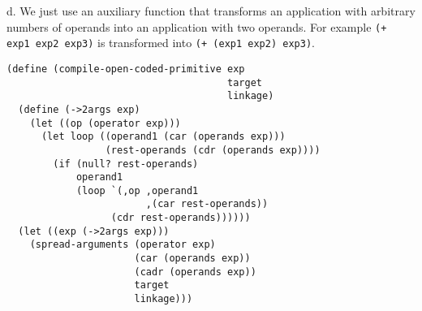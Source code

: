 \documentclass[a4paper,12pt]{article}
\newcommand{\subpar}[1]{\medskip \noindent #1.}
\begin{document}
\subpar{d} We just use an auxiliary function that transforms an
application with arbitrary numbers of operands into an application
with two operands.  For example \lstinline!(+ exp1 exp2 exp3)!  is
transformed into \lstinline!(+ (exp1 exp2) exp3)!.

\begin{lstlisting}
(define (compile-open-coded-primitive exp
                                      target
                                      linkage)
  (define (->2args exp)
    (let ((op (operator exp)))
      (let loop ((operand1 (car (operands exp)))
                 (rest-operands (cdr (operands exp))))
        (if (null? rest-operands)
            operand1
            (loop `(,op ,operand1
                        ,(car rest-operands))
                  (cdr rest-operands))))))
  (let ((exp (->2args exp)))
    (spread-arguments (operator exp)
                      (car (operands exp))
                      (cadr (operands exp))
                      target
                      linkage)))
\end{lstlisting}
\end{document}
